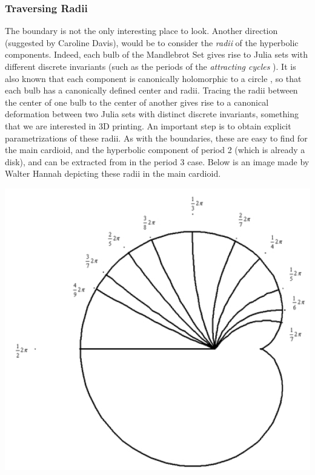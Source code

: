 \documentclass[12 pt]{article}
\begin{document}
\subsubsection{Traversing Radii}
    The boundary is not the only interesting place to look.  Another direction (suggested by Caroline Davis), would be to consider the \textit{radii} of the hyperbolic components.  Indeed, each bulb of the Mandlebrot Set gives rise to Julia sets with different discrete invariants (such as the periods of the \textit{attracting cycles} \cite[Chapter 12]{Milnor}).  It is also known that each component is canonically holomorphic to a circle \cite{Milnor2}, so that each bulb has a canonically defined center and radii.  Tracing the radii between the center of one bulb to the center of another gives rise to a canonical deformation between two Julia sets with distinct discrete invariants, something that we are interested in 3D printing.  An important step is to obtain explicit parametrizations of these radii.  As with the boundaries, these are easy to find for the main cardioid, and the hyperbolic component of period 2 (which is already a disk), and can be extracted from \cite{period3} in the period 3 case.  Below is an image made by Walter Hannah \cite{WHannah} depicting these radii in the main cardioid.
    \begin{center}
        \includegraphics[width=.4\paperwidth]{images/MandleRadii.PNG}\cite{WHannah}
    \end{center}
\end{document}
